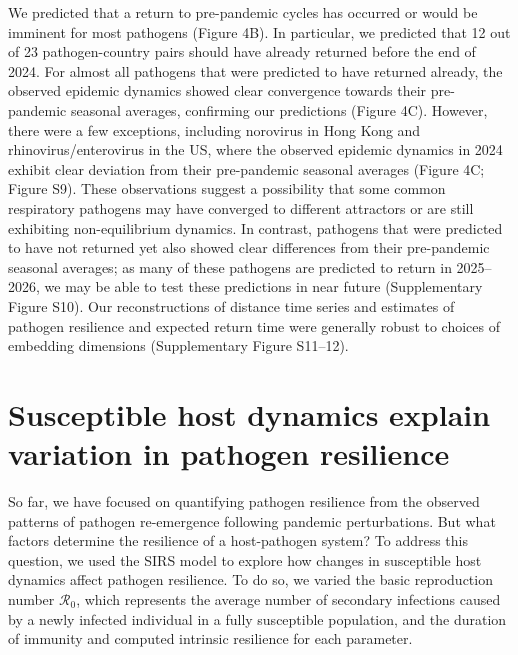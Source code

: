 \documentclass[12pt]{article}
\begin{document}
We predicted that a return to pre-pandemic cycles has occurred or would be imminent for most pathogens (Figure 4B).
In particular, we predicted that 12 out of 23 pathogen-country pairs should have already returned before the end of 2024.
For almost all pathogens that were predicted to have returned already, the observed epidemic dynamics showed clear convergence towards their pre-pandemic seasonal averages, confirming our predictions (Figure 4C).
However, there were a few exceptions, including norovirus in Hong Kong and rhinovirus/enterovirus in the US, where the observed epidemic dynamics in 2024 exhibit clear deviation from their pre-pandemic seasonal averages (Figure 4C; Figure S9).
These observations suggest a possibility that some common respiratory pathogens may have converged to different attractors or are still exhibiting non-equilibrium dynamics.
In contrast, pathogens that were predicted to have not returned yet also showed clear differences from their pre-pandemic seasonal averages; as many of these pathogens are predicted to return in 2025--2026, we may be able to test these predictions in near future (Supplementary Figure S10).
Our reconstructions of distance time series and estimates of pathogen resilience and expected return time were generally robust to choices of embedding dimensions (Supplementary Figure S11--12).

\section*{Susceptible host dynamics explain variation in pathogen resilience}

So far, we have focused on quantifying pathogen resilience from the observed patterns of pathogen re-emergence following pandemic perturbations.
But what factors determine the resilience of a host-pathogen system?
To address this question, we used the SIRS model to explore how changes in susceptible host dynamics affect pathogen resilience.
To do so, we varied the basic reproduction number $\mathcal R_0$, which represents the average number of secondary infections caused by a newly infected individual in a fully susceptible population, and the duration of immunity and computed intrinsic resilience for each parameter.
\end{document}
